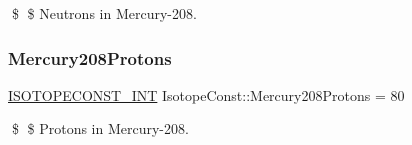 \$ \$ Neutrons in Mercury-\/208. \mbox{\label{group___isotope_const-_mercury-_hg208_ga738c42b9169e7789e5aefaf1280cc07f}} 
\subsubsection{\texorpdfstring{Mercury208\+Protons}{Mercury208Protons}}
{\footnotesize\ttfamily \mbox{\hyperlink{group___isotope_const-_macros_ga5f18360b3e99483a35c32d789e62621c}{I\+S\+O\+T\+O\+P\+E\+C\+O\+N\+S\+T\+\_\+\+I\+NT}} Isotope\+Const\+::\+Mercury208\+Protons = 80}

\$ \$ Protons in Mercury-\/208. 
